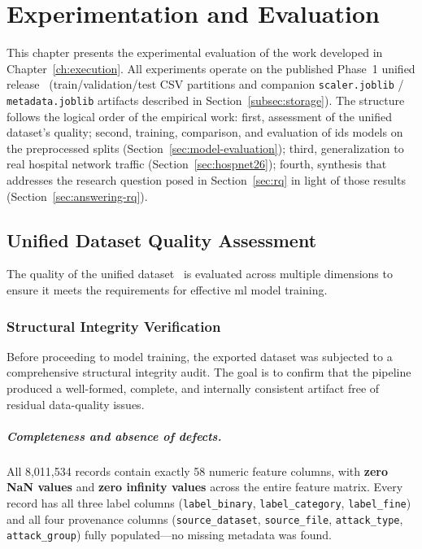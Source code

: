 \chapter{Experimentation and Evaluation}
\label{ch:experimentation}

This chapter presents the experimental evaluation of the work developed in Chapter~\ref{ch:execution}. All experiments operate on the published Phase~1 unified release~\cite{unified_iomt_csuc2026} (train/validation/test CSV partitions and companion \texttt{scaler.joblib} / \texttt{metadata.joblib} artifacts described in Section~\ref{subsec:storage}). The structure follows the logical order of the empirical work: first, assessment of the unified dataset's quality; second, training, comparison, and evaluation of \gls{ids} models on the preprocessed splits (Section~\ref{sec:model-evaluation}); third, generalization to real hospital network traffic (Section~\ref{sec:hospnet26}); fourth, synthesis that addresses the research question posed in Section~\ref{sec:rq} in light of those results (Section~\ref{sec:answering-rq}).

\section{Unified Dataset Quality Assessment}
\label{sec:quality-assessment}

The quality of the unified dataset~\cite{unified_iomt_csuc2026} is evaluated across multiple dimensions to ensure it meets the requirements for effective \gls{ml} model training.

\subsection{Structural Integrity Verification}
\label{subsec:structural-integrity}

Before proceeding to model training, the exported dataset was subjected to a comprehensive structural integrity audit. The goal is to confirm that the pipeline produced a well-formed, complete, and internally consistent artifact free of residual data-quality issues.

\paragraph{Completeness and absence of defects.}
All 8,011,534 records contain exactly 58 numeric feature columns, with \textbf{zero NaN values} and \textbf{zero infinity values} across the entire feature matrix. Every record has all three label columns (\texttt{label\_binary}, \texttt{label\_category}, \texttt{label\_fine}) and all four provenance columns (\texttt{source\_dataset}, \texttt{source\_file}, \texttt{attack\_type}, \texttt{attack\_group}) fully populated---no missing metadata was found.

